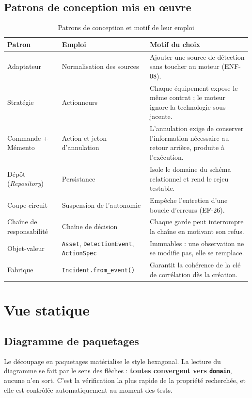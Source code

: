 \subsection{Patrons de conception mis en \oe uvre}
\begin{table}[H]
\centering
\caption{Patrons de conception et motif de leur emploi}
\label{tab:patrons}
\small
\begin{tabular}{@{}p{2.7cm}p{4.3cm}p{6.6cm}@{}}
\toprule
\textbf{Patron} & \textbf{Emploi} & \textbf{Motif du choix} \\
\midrule
Adaptateur & Normalisation des sources & Ajouter une source de d\'etection sans toucher au moteur (ENF-08). \\
Strat\'egie & Actionneurs & Chaque \'equipement expose le m\^eme contrat ; le moteur ignore la technologie sous-jacente. \\
Commande + M\'emento & Action et jeton d'annulation & L'annulation exige de conserver l'information n\'ecessaire au retour arri\`ere, produite \`a l'ex\'ecution. \\
D\'ep\^ot (\emph{Repository}) & Persistance & Isole le domaine du sch\'ema relationnel et rend le rejeu testable. \\
Coupe-circuit & Suspension de l'autonomie & Emp\^eche l'entretien d'une boucle d'erreurs (EF-26). \\
Cha\^ine de responsabilit\'e & Cha\^ine de d\'ecision & Chaque garde peut interrompre la cha\^ine en motivant son refus. \\
Objet-valeur & \texttt{Asset}, \texttt{DetectionEvent}, \texttt{ActionSpec} & Immuables : une observation ne se modifie pas, elle se remplace. \\
Fabrique & \texttt{Incident.from\_event()} & Garantit la coh\'erence de la cl\'e de corr\'elation d\`es la cr\'eation. \\
\bottomrule
\end{tabular}
\end{table}

\section{Vue statique}

\subsection{Diagramme de paquetages}
Le d\'ecoupage en paquetages mat\'erialise le style hexagonal. La lecture du
diagramme se fait par le sens des fl\`eches : \textbf{toutes convergent vers
\texttt{domain}}, aucune n'en sort. C'est la v\'erification la plus rapide de la
propri\'et\'e recherch\'ee, et elle est contr\^ol\'ee automatiquement au moment des tests.

